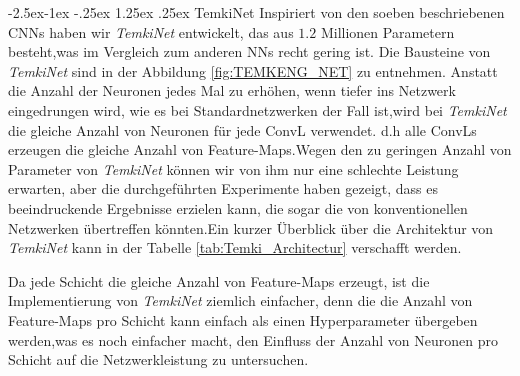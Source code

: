 \documentclass[12pt,a4paper]{scrartcl}
\makeatletter
\numberwithin{equation}{section}
\renewcommand\paragraph{\@startsection{paragraph}{4}{\z@}%
	{-2.5ex\@plus -1ex \@minus -.25ex}%
	{1.25ex \@plus .25ex}%
	{\normalfont\normalsize\bfseries}}
\makeatother
\begin{document}
\paragraph{TemkiNet}\label{exp:TEMKI}
Inspiriert von den soeben beschriebenen \acsp{CNN} haben wir \textit{TemkiNet} entwickelt, das aus $ 1.2 $ Millionen Parametern besteht,was im Vergleich zum anderen \acsp{NN} recht gering ist. Die Bausteine von \textit{TemkiNet} sind in der Abbildung \ref{fig:TEMKENG_NET} zu entnehmen.
Anstatt die Anzahl der Neuronen jedes Mal zu erhöhen, wenn tiefer ins Netzwerk eingedrungen wird, wie es bei Standardnetzwerken der Fall ist,wird bei \textit{TemkiNet} die gleiche Anzahl von Neuronen für jede \ac{ConvL} verwendet. d.h alle \acsp{ConvL} erzeugen die gleiche Anzahl von Feature-Maps.Wegen den zu geringen Anzahl von Parameter von \textit{TemkiNet} können wir von ihm nur eine schlechte Leistung erwarten, aber die durchgeführten Experimente haben gezeigt, dass es beeindruckende Ergebnisse erzielen kann, die sogar die von konventionellen Netzwerken übertreffen könnten.Ein kurzer Überblick über die Architektur von \textit{TemkiNet} kann in der Tabelle \ref{tab:Temki_Architectur} verschafft werden.

Da jede Schicht die gleiche Anzahl von Feature-Maps erzeugt, ist die Implementierung von \textit{TemkiNet} ziemlich einfacher, denn die die Anzahl von Feature-Maps pro Schicht kann einfach als einen Hyperparameter übergeben werden,was es noch einfacher macht, den Einfluss der Anzahl von Neuronen pro Schicht auf die Netzwerkleistung zu untersuchen.
\end{document}
